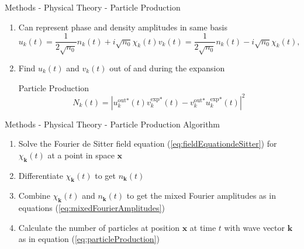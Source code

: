 \documentclass[aspectratio=169]{beamer}
\begin{document}
            \begin{frame}{Methods - Physical Theory - Particle Production}
                \begin{enumerate}
                    \item Can represent phase and density amplitudes in same basis
                        \begin{subequations} \label{eq:mixedFourierAmplitudes}
                        \begin{equation}
                            u_k(t) = \frac{1}{2 \sqrt{n_0}} n_k(t) + i \sqrt{n_0} \chi_k(t)
                        \end{equation}
                        \begin{equation}
                            v_k(t) = \frac{1}{2 \sqrt{n_0}} n_k(t) - i \sqrt{n_0} \chi_k(t),
                        \end{equation}
                        \end{subequations}
                    \item Find $u_k(t)$ and $v_k(t)$ out of and during the expansion
                        \begin{exampleblock}{\centering Particle Production}
                            \begin{equation} \label{eq:particleProduction}
                                N_k(t) = \left| u_k^{\text{out} *}(t) v_k^{\text{exp} *}(t) - v_k^{\text{out} *} u_k^{\text{exp} *}(t) \right|^2
                            \end{equation}
                        \end{exampleblock}
                \end{enumerate}
            \end{frame}

            \begin{frame}{Methods - Physical Theory - Particle Production Algorithm}
                \begin{enumerate}
                    \item Solve the Fourier de Sitter field equation (\ref{eq:fieldEquationdeSitter}) for $\chi_\mathbf{k}(t)$ at a point in space $\mathbf{x}$
                    \item Differentiate $\chi_\mathbf{k}(t)$ to get $n_\mathbf{k}(t)$
                    \item Combine $\chi_\mathbf{k}(t)$ and $n_\mathbf{k}(t)$ to get the mixed Fourier amplitudes as in equations (\ref{eq:mixedFourierAmplitudes})
                    \item Calculate the number of particles at position $\mathbf{x}$ at time $t$ with wave vector $\mathbf{k}$ as in equation (\ref{eq:particleProduction})
                \end{enumerate}
            \end{frame}
\end{document}
